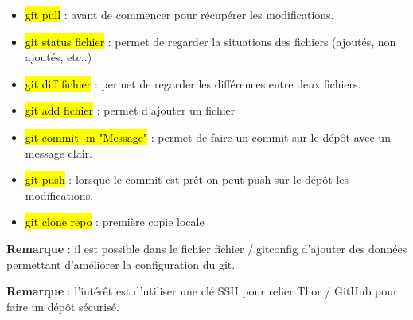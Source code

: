 \documentclass{article}
\begin{document}
\begin{itemize}
    \item {}\hl{git pull} : avant de commencer pour récupérer les modifications.
    \item {}\hl{git status fichier} : permet de regarder la situations des fichiers (ajoutés, non ajoutés, etc..)
    \item {}\hl{git diff fichier} : permet de regarder les différences entre deux fichiers.
    \item {}\hl{git add fichier} : permet d'ajouter un fichier 
    \item {}\hl{git commit -m "Message"} : permet de faire un commit sur le dépôt avec un message clair.
    \item {}\hl{git push} : lorsque le commit est prêt on peut push sur le dépôt les modifications.
    \item {}\hl{git clone repo} : première copie locale
\end{itemize}

\textbf{Remarque} : il est possible dans le fichier fichier /.gitconfig d'ajouter des données permettant d'améliorer la configuration du git.

\textbf{Remarque} : l'intérêt est d'utiliser une clé SSH pour relier Thor / GitHub pour faire un dépôt sécurisé.
\end{document}
